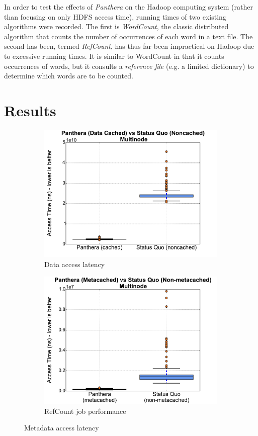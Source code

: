 \documentclass[12pt]{article}
\begin{document}
In order to test the effects of \textit{Panthera} on the Hadoop computing system (rather than focusing on only HDFS access time), running times of two existing algorithms were recorded. The first is \textit{WordCount}, the classic distributed algorithm that counts the number of occurrences of each word in a text file. The second has been, termed \textit{RefCount}, has thus far been impractical on Hadoop due to excessive running times. It is similar to WordCount in that it counts occurrences of words, but it consults a \textit{reference file} (e.g. a limited dictionary) to determine which words are to be counted.

\section{Results}
\begin{figure}
\centering
\begin{subfigure}{.5\textwidth}
  \centering
  \includegraphics[scale=0.3]{assets/v2/getter_boxplot.pdf}
  \caption{Data access latency}
  \label{data}
\end{subfigure}%
\begin{subfigure}{.5\textwidth}
  \centering
  \includegraphics[scale=0.3]{assets/v2/multinode_meta_box_plot.pdf}
  \caption{RefCount job performance}
  \label{meta}
\end{subfigure}
\caption{Metadata access latency}
\label{fig:test}
\end{figure}
\end{document}
